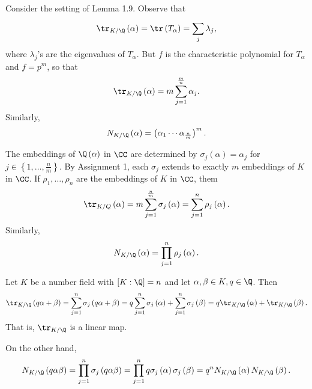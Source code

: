 \documentclass[pmath441]{subfiles}
\begin{document}
    \np Consider the setting of Lemma 1.9. Observe that
    \begin{equation*}
        \tr_{K /\Q}\left( \alpha \right) = \tr\left( T_{\alpha} \right) = \sum^{}_{j} \lambda_j,
    \end{equation*}
    where $\lambda_j$'s are the eigenvalues of $T_{\alpha}$. But $f$ is the characteristic polynomial for $T_{\alpha}$ and $f=p^m$, so that
    \begin{equation*}
        \tr_{K /\Q}\left( \alpha \right) = m\sum^{\frac{m}{n}}_{j=1}\alpha_j.
    \end{equation*}
    Similarly,
    \begin{equation*}
        N_{K /\Q}\left( \alpha \right) = \left( \alpha_1\cdots\alpha_{\frac{n}{m}} \right)^m.
    \end{equation*}
    
    \np The embeddings of $\Q\left( \alpha \right)$ in $\CC$ are determined by $\sigma_j\left( \alpha \right)=\alpha_j$ for $j\in\left\lbrace 1,\ldots,\frac{n}{m} \right\rbrace$. By Assignment 1, each $\sigma_j$ extends to exactly $m$ embeddings of $K$ in $\CC$. If $\rho_1,\ldots,\rho_n$ are the embeddings of $K$ in $\CC$, them
    \begin{equation*}
        \tr_{K /Q}\left( \alpha \right) = m\sum^{\frac{n}{m}}_{j=1} \sigma_j\left( \alpha \right) = \sum^{n}_{j=1}\rho_j\left( \alpha \right).
    \end{equation*}
    Similarly,
    \begin{equation*}
        N_{K /\Q}\left( \alpha \right) = \prod^{n}_{j=1} \rho_j\left( \alpha \right).
    \end{equation*}

    \np Let $K$ be a number field with $\left[ K:\Q \right]=n$ and let $\alpha,\beta\in K, q\in\Q$. Then
    \begin{equation*}
        \tr_{K /\Q}\left( q\alpha+\beta \right) = \sum^{n}_{j=1}\sigma_j\left( q\alpha+\beta \right) = q\sum^{n}_{j=1}\sigma_j\left( \alpha \right) + \sum^{n}_{j=1}\sigma_j\left( \beta \right) = q\tr_{K /\Q}\left( \alpha \right) + \tr_{K /\Q}\left( \beta \right).
    \end{equation*}
    That is, $\tr_{K /\Q}$ is a linear map.

    On the other hand,
    \begin{equation*}
        N_{K /\Q}\left( q\alpha\beta \right) = \prod^{n}_{j=1} \sigma_j\left( q\alpha\beta \right) = \prod^{n}_{j=1} q\sigma_j\left( \alpha \right)\sigma_j\left( \beta \right) = q^nN_{K /\Q}\left( \alpha \right)N_{K /\Q}\left( \beta \right).
    \end{equation*}
    
\end{document}

